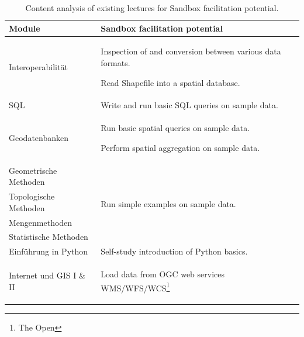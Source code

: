 \documentclass[11pt, a4paper, oneside, parskip=full-]{scrartcl}
\begin{document}
\begin{table}[!htbp]
  \centering
  \caption{Content analysis of existing lectures for Sandbox facilitation potential.}
  \label{tab:tContentAnalysis}
  \begin{tabularx}{\textwidth}{lX}
    \toprule
    \textbf{Module} & \textbf{Sandbox facilitation potential} \\
    \midrule
    Interoperabilität &
      \begin{itemize}[left=0pt,nosep,before={\begin{minipage}[t]{\hsize}},after
      ={\end{minipage}}]
      \item Inspection of and conversion between various data formats.
      \item Read Shapefile into a spatial database.
      \end{itemize}\nointerlineskip\\
    \midrule
    SQL & Write and run basic SQL queries on sample data. \\
    \midrule
    Geodatenbanken &
    \begin{itemize}[left=0pt,nosep,before={\begin{minipage}[t]{\hsize}},after
    ={\end{minipage}}]
      \item Run basic spatial queries on sample data.
      \item Perform spatial aggregation on sample data.
      \end{itemize}\nointerlineskip\\
    \midrule
    Geometrische Methoden & \multirow[t]{4}{*}{Run simple examples on sample
    data.} \\
    \cmidrule(r){1-1} Topologische Methoden &  \\
    \cmidrule(r){1-1} Mengenmethoden &  \\
    \cmidrule(r){1-1} Statistische Methoden &  \\
    \midrule
    Einführung in Python & Self-study introduction of Python basics. \\
    \midrule
    Internet und GIS I \& II &
      \begin{itemize}[left=0pt,nosep,before={\begin{minipage}[t]{\hsize}},after
      ={\end{minipage}}]
      \item Load data from OGC web services WMS/WFS/WCS\footnote{The Open
}
\end{itemize}
\end{tabularx}
\end{table}
\end{document}
